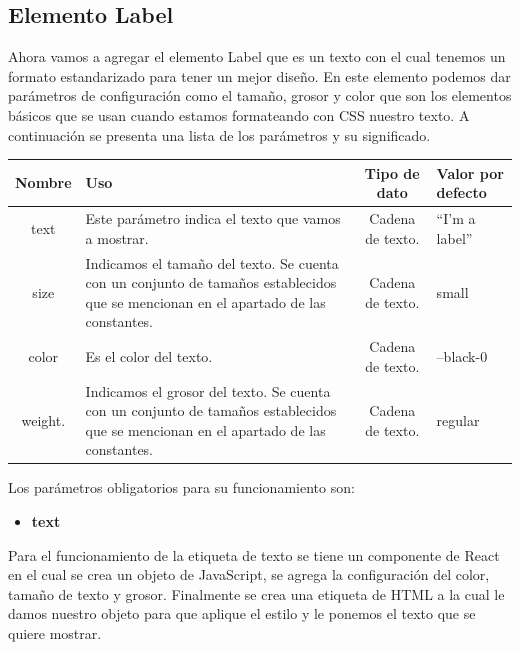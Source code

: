 \subsection{Elemento Label}
Ahora vamos a agregar el elemento Label que es un texto con el cual tenemos un formato estandarizado para tener un mejor diseño. En este elemento podemos dar parámetros de configuración como el tamaño, grosor y color que son los elementos básicos que se usan cuando estamos formateando con CSS nuestro texto. 
A continuación se presenta una lista de los parámetros y  su significado.
\newline
\begin{center}
 \begin{tabular}{ | c |  p{5cm}  | c | p{3cm} |} 
 \hline
 \textbf{Nombre} &  \textbf{Uso} &  \textbf{ Tipo de dato} &  \textbf{Valor por defecto}\\ [0.5ex] 
 \hline\hline
text 		& Este parámetro  indica el texto que vamos a mostrar.  &  Cadena de texto. 	& “I’m a label” \\  [2.5ex] 
 \hline
size 	        & Indicamos el tamaño del texto. Se cuenta con un conjunto de tamaños establecidos que se mencionan en el apartado de las constantes.       & Cadena de texto.  	& small \\[2.5ex] 
 \hline
color        & Es el color del texto.						    & Cadena de texto. 	& --black-0 \\[3.5ex] 
 \hline
 weight.   & Indicamos el grosor del texto. Se cuenta con un conjunto de tamaños establecidos que se mencionan en el apartado de las constantes.&  Cadena de texto. 	& regular \\[2.5ex] 
 \hline
\end{tabular}
\end{center}
\newline
\newline
Los parámetros obligatorios para su funcionamiento son:
\begin{itemize}
\item \textbf{text} 
\end{itemize}
\newline
\newline
Para el funcionamiento de la etiqueta de texto se tiene un componente de React en el cual se crea un objeto de JavaScript, se agrega la configuración del color, tamaño de texto y grosor. Finalmente se crea una etiqueta de HTML a la cual le damos nuestro objeto para que aplique el estilo y le ponemos el texto que se quiere mostrar.
\newline

